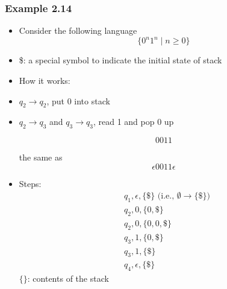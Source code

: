 \begin{frame}[allowframebreaks] \frametitle{Example 2.14}
  \begin{itemize}
  \item Consider the following language
    \begin{equation*}
    \{0^n 1^n\mid n \geq 0\}
  \end{equation*}

\begin{center}
\end{center}
\item \$: a special symbol to indicate the initial state of stack

  
\item How it works:
  \item [] $q_2 \rightarrow q_2$, put 0 into stack

  \item [] $q_2 \rightarrow q_3$ and $q_3 \rightarrow q_3$, read 1 and  pop 0 up

  \begin{equation*}
    0011
  \end{equation*}

the same as
  \begin{equation*}
    \epsilon 0011 \epsilon
  \end{equation*}
\item Steps:
  \begin{equation*}
    \begin{split}
& q_1, \epsilon, \{\$\} \text{ (i.e.,  $\emptyset \rightarrow \{\$\}$)}\\
& q_2, 0, \{0,\$\} \\
& q_2, 0, \{0,0,\$\}\\
& q_3, 1, \{0,\$\}\\
& q_3, 1, \{\$\}\\
& q_4, \epsilon, \{\$\}
\end{split}
\end{equation*}
$\{\}$: contents of the stack


\end{itemize}
\end{frame}
